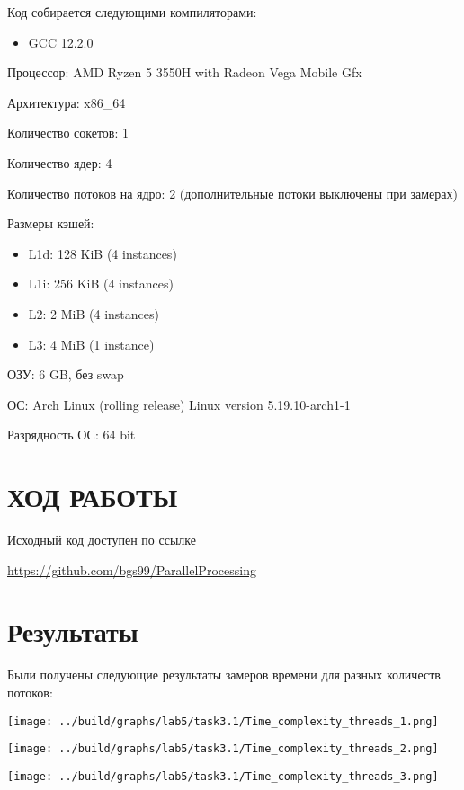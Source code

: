 \documentclass[14pt, a4paper, oneside, final]{extarticle}
\begin{document}
Код собирается следующими компиляторами:
\begin{itemize}
 \setlength{\itemindent}{3em}
 \item GCC 12.2.0
\end{itemize}

Процессор: AMD Ryzen 5 3550H with Radeon Vega Mobile Gfx

Архитектура: x86\_64

Количество сокетов: 1

Количество ядер: 4

Количество потоков на ядро: 2 (дополнительные потоки выключены при замерах)

Размеры кэшей:
\begin{itemize}
 \setlength{\itemindent}{3em}
 \item L1d: 128 KiB (4 instances)
 \item L1i: 256 KiB (4 instances)
 \item L2: 2 MiB (4 instances)
 \item L3: 4 MiB (1 instance)
\end{itemize}

ОЗУ: 6 GB, без swap

ОС: Arch Linux (rolling release) Linux version 5.19.10-arch1-1

Разрядность ОС: 64 bit


\clearpage
\section*{ХОД РАБОТЫ}
Исходный код доступен по ссылке

\url{https://github.com/bgs99/ParallelProcessing}

\clearpage

\section*{Результаты}

Были получены следующие результаты замеров времени для разных количеств потоков:

\texttt{[image: ../build/graphs/lab5/task3.1/Time\_complexity\_threads\_1.png]}


\texttt{[image: ../build/graphs/lab5/task3.1/Time\_complexity\_threads\_2.png]}

\texttt{[image: ../build/graphs/lab5/task3.1/Time\_complexity\_threads\_3.png]}
\end{document}
